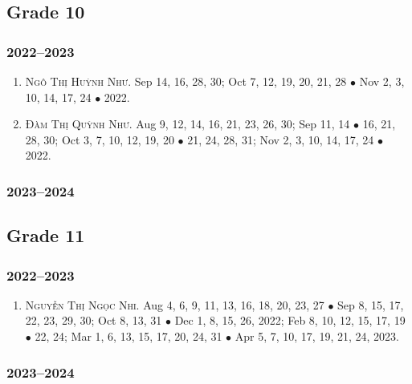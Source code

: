\documentclass{article}
\begin{document}
\subsection{Grade 10}

\subsubsection{2022--2023}

\begin{enumerate}
	\item \textsc{Ngô Thị Huỳnh Như.} {\sf[In]} Sep 14, 16, 28, 30; Oct 7, 12, 19, 20, 21, 28 $\bullet$ Nov 2, 3, 10, 14, 17, 24 $\bullet$ 2022. {\sf[Out]}
	\item \textsc{Đàm Thị Quỳnh Như.} {\sf[In]} Aug 9, 12, 14, 16, 21, 23, 26, 30; Sep 11, 14 $\bullet$ 16, 21, 28, 30; Oct 3, 7, 10, 12, 19, 20 $\bullet$ 21, 24, 28, 31; Nov 2, 3, 10, 14, 17, 24 $\bullet$ 2022. {\sf[Out]}
\end{enumerate}

\subsubsection{2023--2024}


\subsection{Grade 11}

\subsubsection{2022--2023}

\begin{enumerate}
	\item \textsc{Nguyễn Thị Ngọc Nhi.} {\sf[In]} Aug 4, 6, 9, 11, 13, 16, 18, 20, 23, 27 $\bullet$ Sep 8, 15, 17, 22, 23, 29, 30; Oct 8, 13, 31 $\bullet$ Dec 1, 8,  15, 26, 2022; Feb 8, 10, 12, 15, 17, 19 $\bullet$ 22, 24; Mar 1, 6, 13, 15, 17, 20, 24, 31 $\bullet$ Apr 5, 7, 10, 17, 19, 21, 24, 2023.
\end{enumerate}

\subsubsection{2023--2024}

\end{document}
